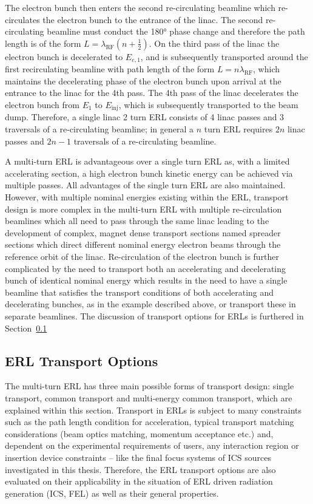 \documentclass[../main.tex]{subfiles}
\begin{document}
The electron bunch then enters the second re-circulating beamline which re-circulates the electron bunch to the entrance of the linac. The second re-circulating beamline must conduct the 180\si{\degree} phase change and therefore the path length is of the form $L=\lambda_{\mathrm{RF}}\left(n+\frac{1}{2}\right)$. On the third pass of the linac the electron bunch is decelerated to $E_{e,1}$, and is subsequently transported around the first recirculating beamline with path length of the form $L=n\lambda_{\mathrm{RF}}$, which maintains the decelerating phase of the electron bunch upon arrival at the entrance to the linac for the 4th pass. The 4th pass of the linac decelerates the electron bunch from $E_{1}$ to $E_{\mathrm{inj}}$, which is subsequently transported to the beam dump. Therefore, a single linac 2 turn ERL consists of 4 linac passes and 3 traversals of a re-circulating beamline; in general a $n$ turn ERL requires $2n$ linac passes and $2n-1$ traversals of a re-circulating beamline.

A multi-turn ERL is advantageous over a single turn ERL as, with a limited accelerating section, a high electron bunch kinetic energy can be achieved via multiple passes. All advantages of the single turn ERL are also maintained. However, with multiple nominal energies existing within the ERL, transport design is more complex in the multi-turn ERL with multiple re-circulation beamlines which all need to pass through the same linac leading to the development of complex, magnet dense transport sections named spreader sections which direct different nominal energy electron beams through the reference orbit of the linac. Re-circulation of the electron bunch is further complicated by the need to transport both an accelerating and decelerating bunch of identical nominal energy which results in the need to have a single beamline that satisfies the transport conditions of both accelerating and decelerating bunches, as in the example described above, or transport these in separate beamlines. The discussion of transport options for ERLs is furthered in Section~\ref{sec:ERL_transport_options} 

\subsection{ERL Transport Options}
\label{sec:ERL_transport_options}

The multi-turn ERL has three main possible forms of transport design: single transport, common transport and multi-energy common transport, which are explained within this section. Transport in ERLs is subject to many constraints such as the path length condition for acceleration, typical transport matching considerations (beam optics matching, momentum acceptance etc.) and, dependent on the experimental requirements of users, any interaction region or insertion device constraints -- like the final focus systems of ICS sources investigated in this thesis. Therefore, the ERL transport options are also evaluated on their applicability in the situation of ERL driven radiation generation (ICS, FEL) as well as their general properties.
\end{document}
